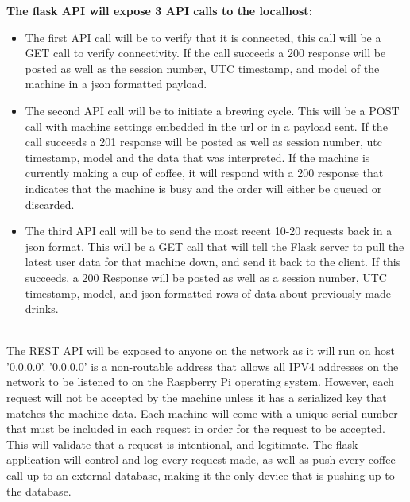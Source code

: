 \documentclass[conference]{IEEEtran}
\begin{document}
\indent\textbf{The flask API will expose 3 API calls to the localhost:} \\ 
\begin{itemize}
\item The first API call will be to verify that it is connected, this call will
be a GET call to verify connectivity. If the call succeeds a 200 response will
be posted as well as the session number, UTC timestamp, and model of the
machine in a json formatted payload.
\item The second API call will be to initiate a brewing cycle. This will be a
POST call with machine settings embedded in the url or in a payload sent. If the
call succeeds a 201 response will be posted as well as session number, utc
timestamp, model and the data that was interpreted. If the machine is currently
making a cup of coffee, it will respond with a 200 response that indicates that
the machine is busy and the order will either be queued or discarded.
\item The third API call will be to send the most recent 10-20 requests back in
a json format. This will be a GET call that will tell the Flask server to pull
the latest user data for that machine down, and send it back to the client. If
this succeeds, a 200 Response will be posted as well as a session number, UTC
timestamp, model, and json formatted rows of data about previously made drinks.
\end{itemize}
\ \\


The REST API will be exposed to anyone on the network as it will run on host
'0.0.0.0'. '0.0.0.0' is a non-routable address that allows all IPV4 addresses
on the network to be listened to on the Raspberry Pi operating system.
However, each request will not be accepted by the machine unless it has a
serialized key that matches the machine data. Each machine will come with a
unique serial number that must be included in each request in order for the
request to be accepted. This will validate that a request is intentional, and
legitimate.
The flask application will control and log every request made, as well as push
every coffee call up to an external database, making it the only device that is
pushing up to the database.
\end{document}
